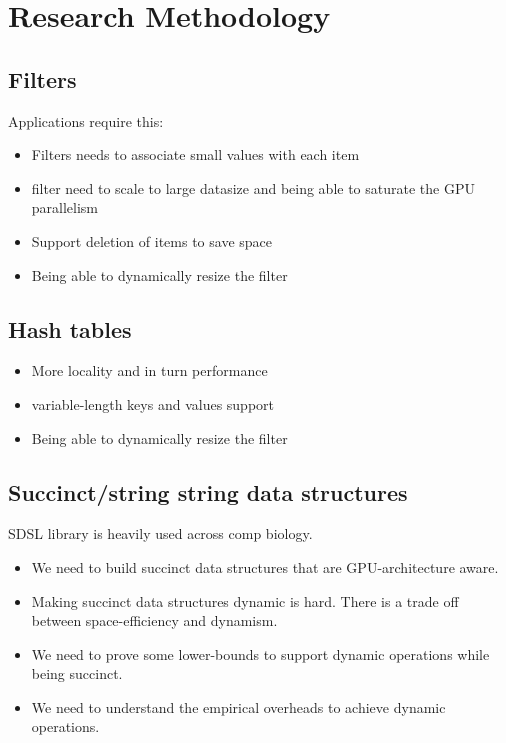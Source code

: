 \section{Research Methodology}


\subsection{Filters}
Applications require this:
\begin{itemize}
    \item Filters needs to associate small values with each item
    \item filter need to scale to large datasize and being able to saturate the GPU parallelism
    \item Support deletion of items to save space
    \item Being able to dynamically resize the filter
\end{itemize}

\subsection{Hash tables}
\begin{itemize}
    \item More locality and in turn performance
    \item variable-length keys and values support
    \item Being able to dynamically resize the filter
\end{itemize}

\subsection{Succinct/string string data structures}
SDSL library is heavily used across comp biology. 

\begin{itemize}
    \item We need to build succinct data structures that are GPU-architecture aware.
    \item Making succinct data structures dynamic is hard. There is a trade off between space-efficiency and dynamism.
    \item We need to prove some lower-bounds to support dynamic operations while being succinct.
    \item We need to understand the empirical overheads to achieve dynamic operations. 
\end{itemize}

